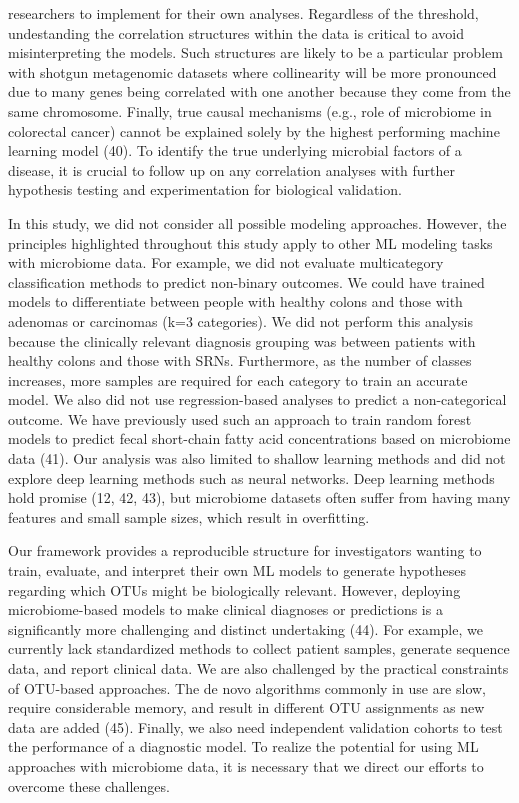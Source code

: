 \documentclass[
  11pt,
]{article}
\begin{document}
researchers to implement for their own analyses. Regardless of the
threshold, undestanding the correlation structures within the data is
critical to avoid misinterpreting the models. Such structures are likely
to be a particular problem with shotgun metagenomic datasets where
collinearity will be more pronounced due to many genes being correlated
with one another because they come from the same chromosome. Finally,
true causal mechanisms (e.g., role of microbiome in colorectal cancer)
cannot be explained solely by the highest performing machine learning
model (40). To identify the true underlying microbial factors of a
disease, it is crucial to follow up on any correlation analyses with
further hypothesis testing and experimentation for biological
validation.

In this study, we did not consider all possible modeling approaches.
However, the principles highlighted throughout this study apply to other
ML modeling tasks with microbiome data. For example, we did not evaluate
multicategory classification methods to predict non-binary outcomes. We
could have trained models to differentiate between people with healthy
colons and those with adenomas or carcinomas (k=3 categories). We did
not perform this analysis because the clinically relevant diagnosis
grouping was between patients with healthy colons and those with SRNs.
Furthermore, as the number of classes increases, more samples are
required for each category to train an accurate model. We also did not
use regression-based analyses to predict a non-categorical outcome. We
have previously used such an approach to train random forest models to
predict fecal short-chain fatty acid concentrations based on microbiome
data (41). Our analysis was also limited to shallow learning methods and
did not explore deep learning methods such as neural networks. Deep
learning methods hold promise (12, 42, 43), but microbiome datasets
often suffer from having many features and small sample sizes, which
result in overfitting.

Our framework provides a reproducible structure for investigators
wanting to train, evaluate, and interpret their own ML models to
generate hypotheses regarding which OTUs might be biologically relevant.
However, deploying microbiome-based models to make clinical diagnoses or
predictions is a significantly more challenging and distinct undertaking
(44). For example, we currently lack standardized methods to collect
patient samples, generate sequence data, and report clinical data. We
are also challenged by the practical constraints of OTU-based
approaches. The de novo algorithms commonly in use are slow, require
considerable memory, and result in different OTU assignments as new data
are added (45). Finally, we also need independent validation cohorts to
test the performance of a diagnostic model. To realize the potential for
using ML approaches with microbiome data, it is necessary that we direct
our efforts to overcome these challenges.
\end{document}
